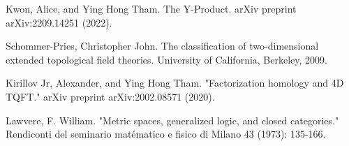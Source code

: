\documentclass[12pt]{article}
\begin{document}
%
%
%



\begin{thebibliography}{1}

 Kwon, Alice, and Ying Hong Tham. The Y-Product. arXiv preprint arXiv:2209.14251 (2022).

 Schommer-Pries, Christopher John. The classification of two-dimensional extended topological field theories. University of California, Berkeley, 2009.

 Kirillov Jr, Alexander, and Ying Hong Tham. "Factorization homology and 4D TQFT." arXiv preprint arXiv:2002.08571 (2020).

 Lawvere, F. William. "Metric spaces, generalized logic, and closed categories." Rendiconti del seminario matématico e fisico di Milano 43 (1973): 135-166.

\end{thebibliography}
\end{document}

